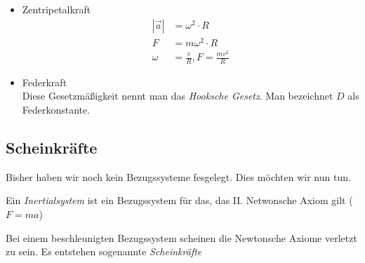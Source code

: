 \documentclass[a4paper,10pt]{scrartcl}
\begin{document}
\\
\\
\begin{itemize}
 \item 
\begin{seg}{Zentripetalkraft}
\\
\begin{align*}
 |\vec a|&=\omega^2\cdot R\\
F&=m\omega^2\cdot R\\
\omega&=\frac{v}{R}, F=\frac{mv^2}{R}
\end{align*}
\end{seg}
\item 
\begin{seg}{Federkraft}
 \\
Diese Gesetzmäßigkeit nennt man das \emph{Hooksche Gesetz}. Man bezeichnet $D$ als Federkonstante.
\end{seg}
\end{itemize}
\subsection{Scheinkräfte}
Bisher haben wir noch kein Bezugssysteme fesgelegt. Dies möchten wir nun tun.
\begin{df}[Inertialsystem]
 Ein \emph{Inertialsystem} ist ein Bezugssystem für das, das II. Netwonsche Axiom gilt ($F=ma$)
\end{df}
Bei einem beschleunigten Bezugssystem scheinen die Newtonsche Axiome verletzt zu sein. Es entstehen sogenannte \emph{Scheinkräfte}
\end{document}
